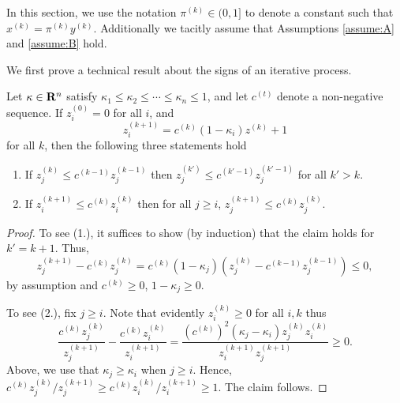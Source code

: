 \documentclass[11pt]{article}
\begin{document}

In this section, we use the notation $\pi^{(k)} \in (0, 1]$ to denote
  a constant such that $x^{(k)} = \pi^{(k)} y^{(k)}$. Additionally we tacitly assume that
  Assumptions \ref{assume:A} and \ref{assume:B} hold.

We first prove a technical result about the signs of an iterative process. 
\begin{lem}\label{lem:process-signs}
  Let $\kappa \in \mathbf{R}^n$ satisfy $\kappa_1 \leq \kappa_2 \leq \cdots \leq \kappa_n \leq 1$, and let
  $c^{(t)}$ denote a non-negative sequence. If $z^{(0)}_i = 0$ for all $i$, and
  \[
  z^{(k + 1)}_i = c^{(k)} (1 - \kappa_i) z^{(k)} + 1
  \]
  for all $k$, then the following three statements hold
  \begin{enumerate}
  \item If $z_j^{(k)} \leq c^{(k - 1)}z_j^{(k - 1)}$ then $z_j^{(k')} \leq c^{(k' - 1)}z_j^{(k' - 1)}$ for all $k ' > k$.
  \item If $z_i^{(k + 1)} \leq c^{(k)}z_i^{(k)}$ then for all $j \geq i$, $z_j^{(k + 1)} \leq c^{(k)}z_j^{(k)}$. 
  \end{enumerate}
  \begin{proof}
    To see (1.), it suffices to show (by induction) that the claim holds for $k' = k + 1$. Thus,
    \[
    z_j^{(k + 1)} - c^{(k)} z_j^{(k)} = c^{(k)}(1 - \kappa_j)\left(z_j^{(k)} -c^{(k - 1)}z_j^{(k - 1)}\right) \leq 0,
    \]
    by assumption and $c^{(k)} \geq 0$, $1-\kappa_j\geq 0$.

    To see (2.), fix $j \geq i$. Note that evidently $z_i^{(k)} \geq 0$ for all $i, k$ thus
    \[
    \frac{c^{(k)} z_j^{(k)}}{z_j^{(k + 1)}} - \frac{c^{(k)}z_i^{(k)}}{z_i^{(k + 1)}}
    = \frac{(c^{(k)})^2 ( \kappa_j - \kappa_i) z_j^{(k)} z_i^{(k)}}{z_i^{(k + 1)}z_j^{(k +1)}}
    \geq 0.
    \]
    Above, we use that $\kappa_j \geq \kappa_i$ when $j \geq i$. 
    Hence, $c^{(k)}z_j^{(k)}/z_j^{(k + 1)} \geq c^{(k)}z_i^{(k)}/z_i^{(k + 1)} \geq 1$. The claim follows. 
  \end{proof}
\end{lem}  
\end{document}
